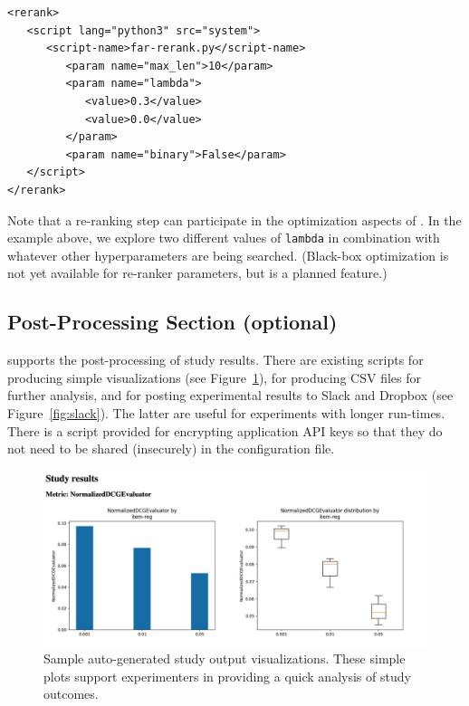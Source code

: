 {\small
\begin{verbatim}
<rerank>
   <script lang="python3" src="system">
      <script-name>far-rerank.py</script-name>
         <param name="max_len">10</param>
         <param name="lambda">
            <value>0.3</value>
            <value>0.0</value>
         </param>
         <param name="binary">False</param>
   </script>
</rerank>
\end{verbatim}}

Note that a re-ranking step can participate in the optimization aspects of \libauto{}. In the example above, we explore two different values of \texttt{lambda} in combination with whatever other hyperparameters are being searched. (Black-box optimization is not yet available for re-ranker parameters, but is a planned feature.)

\subsection{Post-Processing Section (optional)}
\libauto{} supports the post-processing of study results. There are existing scripts for producing simple visualizations (see Figure~\ref{fig:viz}), for producing CSV files for further analysis, and for posting experimental results to Slack and Dropbox (see Figure~\ref{fig:slack}). The latter are useful for experiments with longer run-times. There is a script provided for encrypting application API keys so that they do not need to be shared (insecurely) in the configuration file. 

\begin{figure}[!htb]
    \centering
    \includegraphics[width=0.8\linewidth]{imgs/la/sample-output.png}
    \caption{Sample auto-generated study output visualizations. These simple plots support experimenters in providing a quick analysis of study outcomes.}
    \label{fig:viz}
    \vspace{-0.15in}
\end{figure}

